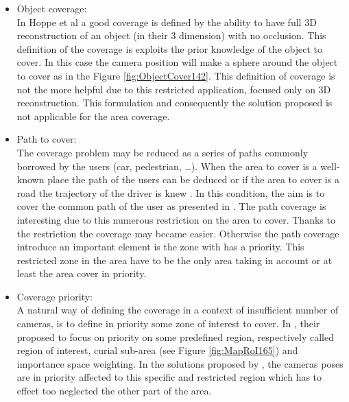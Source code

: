 \begin{itemize}
\item Object coverage: \\
   In Hoppe et al \cite{142*hoppe2012}  a good coverage is defined by the ability to have full 3D reconstruction of an object (in their 3 dimension) with no occlusion. This definition of the coverage is exploits the prior knowledge of the object to cover. In this case the camera position will make a sphere around the object to cover as in the Figure \ref{fig:ObjectCover142}. 
   This definition of coverage is not the more helpful due to this restricted application, focused only on 3D reconstruction. This formulation and  consequently the solution proposed is not applicable for the area coverage.\\ 
   \item Path to cover: \\
   The coverage problem may be reduced as a series of paths commonly borrowed by the users (car, pedestrian, …). When the area to cover is a well-known place the path of the users can be deduced \cite{27*bodor2005} or if the area to cover is a road the trajectory of the driver is knew \cite{14*lu2011}.  In this condition, the aim is to cover the common path of the user as presented in  \cite{14*lu2011,27*bodor2005,30*bodor2005,81*nikolaidis2009}. The path coverage is interesting due to this numerous restriction on the area to cover. Thanks to the restriction the coverage may became easier. Otherwise the path coverage introduce an important element is the zone with has a priority. This restricted zone in the area have to be the only area taking in account or  at least  the area  cover in priority.\\
   \item Coverage priority: \\
   A natural way of defining the coverage in a context of insufficient number of cameras, is to define in priority some zone of interest to cover.
    In \cite{84*xu2011,165*jiang2010,171*horster2006}, their proposed to focus on priority on some predefined region, respectively called region of interest, curial sub-area (see Figure \ref{fig:MapRoI165}) and importance space weighting.  In the solutions proposed  by \cite{84*xu2011,165*jiang2010,171*horster2006}, the cameras poses are in priority affected to this specific and restricted region which has to effect too neglected the other part of the area. \\

\end{itemize}
